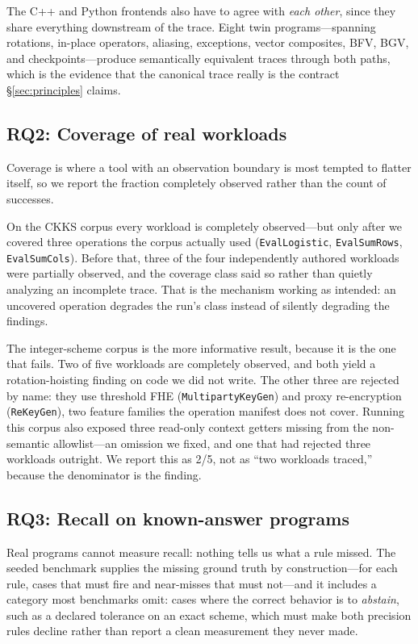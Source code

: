 \documentclass[sigconf,nonacm]{acmart}
\begin{document}
The C++ and Python frontends also have to agree with \emph{each other},
since they share everything downstream of the trace. Eight twin
programs---spanning rotations, in-place operators, aliasing, exceptions,
vector composites, BFV, BGV, and checkpoints---produce semantically
equivalent traces through both paths, which is the evidence that the
canonical trace really is the contract \S\ref{sec:principles} claims.

\subsection{RQ2: Coverage of real workloads}
\label{sec:rq2}

Coverage is where a tool with an observation boundary is most tempted to
flatter itself, so we report the fraction completely observed rather than
the count of successes.

On the CKKS corpus every workload is completely observed---but only after we
covered three operations the corpus actually used
(\texttt{EvalLogistic}, \texttt{EvalSumRows}, \texttt{EvalSumCols}). Before
that, three of the four independently authored workloads were partially
observed, and the coverage class said so rather than quietly analyzing an
incomplete trace. That is the mechanism working as intended: an uncovered
operation degrades the run's class instead of silently degrading the
findings.

The integer-scheme corpus is the more informative result, because it is the
one that fails. Two of five workloads are completely observed, and both
yield a rotation-hoisting finding on code we did not write. The other three
are rejected by name: they use threshold FHE
(\texttt{MultipartyKeyGen}) and proxy re-encryption (\texttt{ReKeyGen}),
two feature families the operation manifest does not cover. Running this
corpus also exposed three read-only context getters missing from the
non-semantic allowlist---an omission we fixed, and one that had rejected
three workloads outright. We report this as 2/5, not as ``two workloads
traced,'' because the denominator is the finding.

\subsection{RQ3: Recall on known-answer programs}
\label{sec:rq3}

Real programs cannot measure recall: nothing tells us what a rule missed. The
seeded benchmark supplies the missing ground truth by construction---for each
rule, cases that must fire and near-misses that must not---and it includes a
category most benchmarks omit: cases where the correct behavior is to
\emph{abstain}, such as a declared tolerance on an exact scheme, which must
make both precision rules decline rather than report a clean measurement
they never made.
\end{document}
